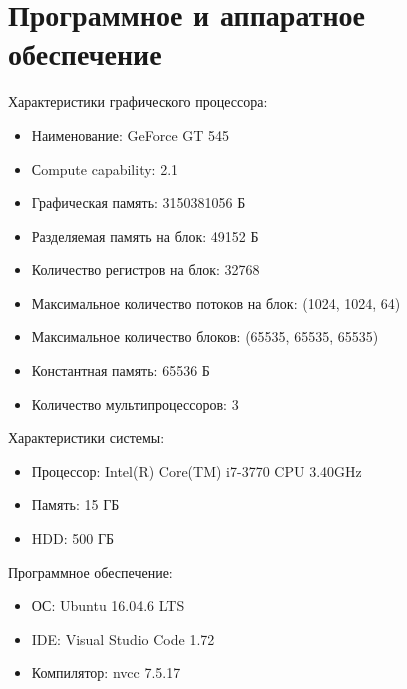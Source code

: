 \section{Программное и аппаратное обеспечение}
Характеристики графического процессора:
\begin{itemize}[noitemsep, topsep=0pt]
	\item Наименование: GeForce GT 545
	\item Сompute capability: 2.1
	\item Графическая память: 3150381056 Б
	\item Разделяемая память на блок: 49152 Б
	\item Количество регистров на блок: 32768
	\item Максимальное количество потоков на блок: (1024, 1024, 64)
	\item Максимальное количество блоков: (65535, 65535, 65535)
	\item Константная память: 65536 Б
	\item Количество мультипроцессоров: 3
\end{itemize}

Характеристики системы:
\begin{itemize}[noitemsep, topsep=0pt]
	\item Процессор: Intel(R) Core(TM) i7-3770 CPU \@ 3.40GHz
	\item Память: 15 ГБ
	\item HDD: 500 ГБ
\end{itemize}

Программное обеспечение:
\begin{itemize}[noitemsep, topsep=0pt]
	\item ОС: Ubuntu 16.04.6 LTS
	\item IDE: Visual Studio Code 1.72
	\item Компилятор: nvcc 7.5.17
\end{itemize}